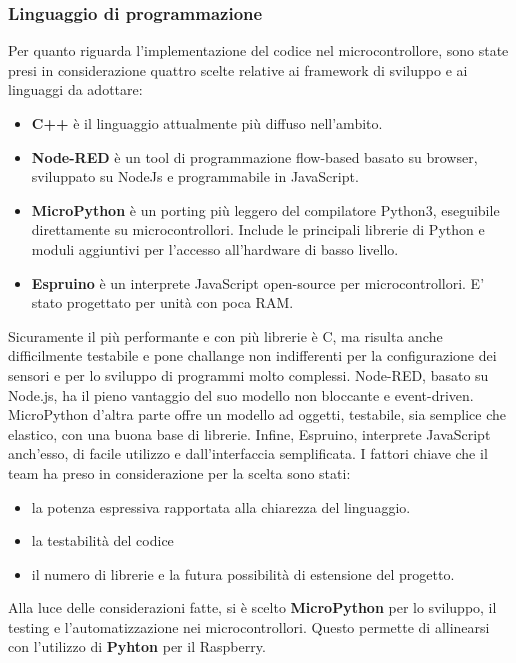         \subsubsection{Linguaggio di programmazione}
        Per quanto riguarda l'implementazione del codice nel microcontrollore, sono state presi in considerazione quattro scelte relative ai framework di sviluppo e ai linguaggi da adottare: 
        \begin{itemize}
            \item \textbf{C++} è il linguaggio attualmente più diffuso nell'ambito. 
            \item \textbf{Node-RED} è un tool di programmazione flow-based basato su browser, sviluppato su NodeJs e programmabile in JavaScript.
            \item \textbf{MicroPython} è un porting più leggero del compilatore Python3, eseguibile direttamente su microcontrollori. Include le principali librerie di Python e moduli aggiuntivi per l'accesso all'hardware di basso livello.
            \item \textbf{Espruino} è un interprete JavaScript open-source per microcontrollori. E' stato progettato per unità con poca RAM.
        \end{itemize}
        Sicuramente il più performante e con più librerie è C, ma risulta anche difficilmente testabile e pone challange non indifferenti per la configurazione dei sensori e per lo sviluppo di programmi molto complessi. Node-RED, basato su Node.js, ha il pieno vantaggio del suo modello non bloccante e event-driven. MicroPython d'altra parte offre un modello ad oggetti, testabile, sia semplice che elastico, con una buona base di librerie. Infine, Espruino, interprete JavaScript anch'esso, di facile utilizzo e dall'interfaccia semplificata. 
        I fattori chiave che il team ha preso in considerazione per la scelta sono stati: 
        \begin{itemize}
            \item la potenza espressiva rapportata alla chiarezza del linguaggio. 
            \item la testabilità del codice
            \item il numero di librerie e la futura possibilità di estensione del progetto.
        \end{itemize}
        Alla luce delle considerazioni fatte, si è scelto \textbf{MicroPython} per lo sviluppo, il testing e l'automatizzazione nei microcontrollori. Questo permette di allinearsi con l'utilizzo di \textbf{Pyhton} per il Raspberry.

